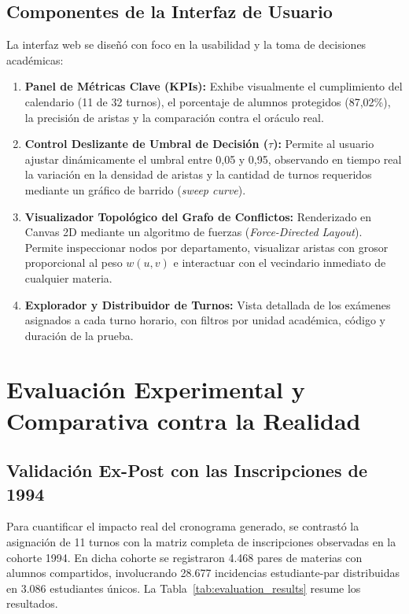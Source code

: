 \documentclass[11pt,a4paper]{article}
\begin{document}
\subsection{Componentes de la Interfaz de Usuario}
La interfaz web se diseñó con foco en la usabilidad y la toma de decisiones académicas:
\begin{enumerate}
    \item \textbf{Panel de Métricas Clave (KPIs):} Exhibe visualmente el cumplimiento del calendario (11 de 32 turnos), el porcentaje de alumnos protegidos (87,02\%), la precisión de aristas y la comparación contra el oráculo real.
    \item \textbf{Control Deslizante de Umbral de Decisión ($\tau$):} Permite al usuario ajustar dinámicamente el umbral entre 0,05 y 0,95, observando en tiempo real la variación en la densidad de aristas y la cantidad de turnos requeridos mediante un gráfico de barrido (\textit{sweep curve}).
    \item \textbf{Visualizador Topológico del Grafo de Conflictos:} Renderizado en Canvas 2D mediante un algoritmo de fuerzas (\textit{Force-Directed Layout}). Permite inspeccionar nodos por departamento, visualizar aristas con grosor proporcional al peso $w(u, v)$ e interactuar con el vecindario inmediato de cualquier materia.
    \item \textbf{Explorador y Distribuidor de Turnos:} Vista detallada de los exámenes asignados a cada turno horario, con filtros por unidad académica, código y duración de la prueba.
\end{enumerate}

\section{Evaluación Experimental y Comparativa contra la Realidad}

\subsection{Validación Ex-Post con las Inscripciones de 1994}
Para cuantificar el impacto real del cronograma generado, se contrastó la asignación de 11 turnos con la matriz completa de inscripciones observadas en la cohorte 1994. En dicha cohorte se registraron 4.468 pares de materias con alumnos compartidos, involucrando 28.677 incidencias estudiante-par distribuidas en 3.086 estudiantes únicos. La Tabla~\ref{tab:evaluation_results} resume los resultados.
\end{document}
